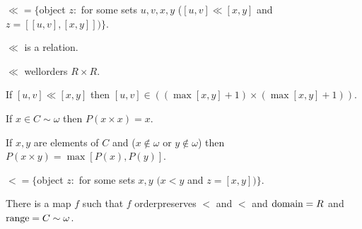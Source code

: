 \documentclass[a4paper,draft]{amsproc}
\begin{document}
\begin{forthel}
\begin{definition}
$\ll = \{$object $z :$ for some sets $u,v,x,y$ ($[u,v] \ll [x,y]$ and $z = [[u,v],[x,y]])\}$.
\end{definition}

\begin{lemma}
$\ll$ is a relation.
\end{lemma}


\begin{theorem}[177]
$\ll$ wellorders $R \times R$.
\end{theorem}

\begin{theorem}[178]
If $[u,v] \ll [x,y]$ then $[u,v] \in ((\max[x,y] + 1) \times (\max[x,y] + 1))$.
\end{theorem}

\begin{theorem}[179]
If $x \in C \sim \omega$ then $P(x \times x) = x$.
\end{theorem}

\begin{theorem}[180]
If $x, y$ are elements of $C$ and ($x \notin \omega$ or $y \notin \omega$) then $P(x \times y) = \max[P(x),P(y)]$.
\end{theorem}

\begin{definition}
$< = \{$object $z :$ for some sets $x,y$ $(x < y$ and $z = [x,y])\}$.
\end{definition}

\begin{theorem}
There is a %
map $f$ such that $f$ orderpreserves $<$ and $<$ and $\domain f = R$ and $\range f = C \sim \omega$.
\end{theorem}

\end{forthel}
\end{document}
